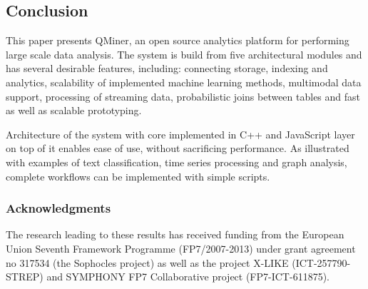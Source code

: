 \documentclass{article} %
\begin{document}
\subsection{Conclusion}
This paper presents QMiner, an open source analytics platform for performing large scale data analysis. The system is build from five architectural modules and has several desirable features, including: connecting storage, indexing and analytics, scalability of implemented machine learning methods, multimodal data support, processing of streaming data, probabilistic joins between tables and fast as well as scalable prototyping.

Architecture of the system with core implemented in C++ and JavaScript layer on top of it enables ease of use, without sacrificing performance. As illustrated with examples of text classification, time series processing and graph analysis, complete workflows can be implemented with simple scripts.

\subsubsection*{Acknowledgments}
The research leading to these results has received funding from the European Union Seventh Framework Programme (FP7/2007-2013) under grant agreement no 317534 (the Sophocles project) as well as the project X-LIKE (ICT-257790-STREP)\cite{xlike} and SYMPHONY FP7 Collaborative project (FP7-ICT-611875).




\end{document}

